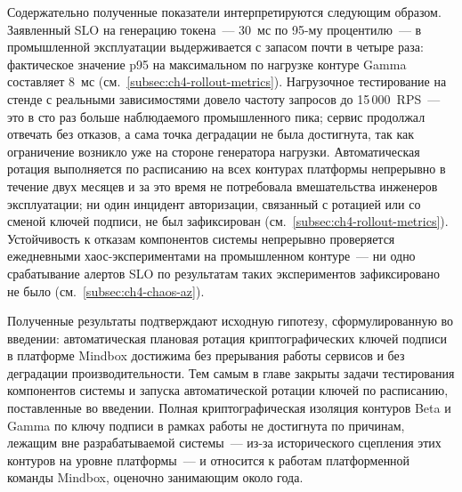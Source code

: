 Содержательно полученные показатели интерпретируются следующим образом.
Заявленный SLO на генерацию токена~--- 30~мс по 95-му процентилю~---
в промышленной эксплуатации выдерживается с запасом почти в четыре
раза: фактическое значение p95 на максимальном по нагрузке контуре
Gamma составляет 8~мс (см.~\ref{subsec:ch4-rollout-metrics}).
Нагрузочное тестирование на стенде с реальными зависимостями
довело частоту запросов до 15\,000~RPS~--- это в сто раз больше
наблюдаемого промышленного пика;
сервис продолжал отвечать без отказов,
а сама точка деградации не была достигнута,
так как ограничение возникло уже на стороне генератора нагрузки.
Автоматическая ротация выполняется по расписанию на всех контурах
платформы непрерывно в течение двух месяцев и за это время
не потребовала вмешательства инженеров эксплуатации;
ни один инцидент авторизации, связанный с ротацией или
со сменой ключей подписи, не был зафиксирован
(см.~\ref{subsec:ch4-rollout-metrics}).
Устойчивость к отказам компонентов системы непрерывно проверяется
ежедневными хаос-экспериментами на промышленном контуре~---
ни одно срабатывание алертов SLO по результатам таких экспериментов
зафиксировано не было (см.~\ref{subsec:ch4-chaos-az}).

Полученные результаты подтверждают исходную гипотезу,
сформулированную во введении:
автоматическая плановая ротация криптографических ключей подписи
в платформе Mindbox достижима без прерывания работы сервисов
и без деградации производительности.
Тем самым в главе закрыты задачи тестирования компонентов системы
и запуска автоматической ротации ключей по расписанию,
поставленные во введении.
Полная криптографическая изоляция контуров Beta и Gamma
по ключу подписи в рамках работы не достигнута
по причинам, лежащим вне разрабатываемой системы~---
из-за исторического сцепления этих контуров на уровне платформы~---
и относится к работам платформенной команды Mindbox,
оценочно занимающим около года.

\FloatBarrier
